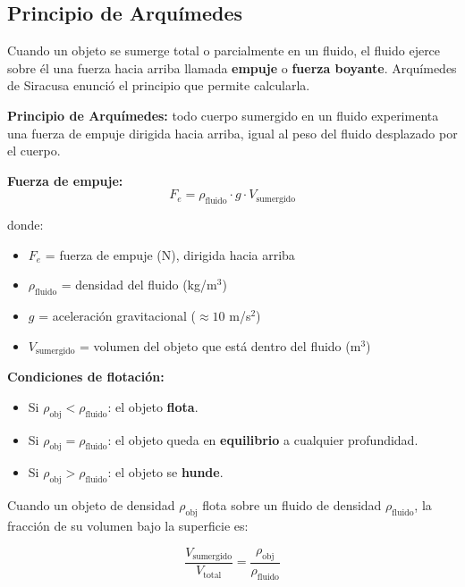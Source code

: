 \subsection{Principio de Arquímedes}

\begin{seccion}
Cuando un objeto se sumerge total o parcialmente en un fluido, el fluido ejerce sobre él una fuerza hacia arriba llamada \textbf{empuje} o \textbf{fuerza boyante}. Arquímedes de Siracusa enunció el principio que permite calcularla.

\begin{definicion}
\textbf{Principio de Arquímedes:} todo cuerpo sumergido en un fluido experimenta una fuerza de empuje dirigida hacia arriba, igual al peso del fluido desplazado por el cuerpo.
\end{definicion}

\begin{ecuacion}
\textbf{Fuerza de empuje:}
$$F_e = \rho_{\text{fluido}} \cdot g \cdot V_{\text{sumergido}}$$

donde:
\begin{itemize}
    \item $F_e$ = fuerza de empuje (N), dirigida hacia arriba
    \item $\rho_{\text{fluido}}$ = densidad del fluido (kg/m$^3$)
    \item $g$ = aceleración gravitacional ($\approx 10$ m/s$^2$)
    \item $V_{\text{sumergido}}$ = volumen del objeto que está dentro del fluido (m$^3$)
\end{itemize}
\end{ecuacion}

\textbf{Condiciones de flotación:}
\begin{itemize}
    \item Si $\rho_{\text{obj}} < \rho_{\text{fluido}}$: el objeto \textbf{flota}.
    \item Si $\rho_{\text{obj}} = \rho_{\text{fluido}}$: el objeto queda en \textbf{equilibrio} a cualquier profundidad.
    \item Si $\rho_{\text{obj}} > \rho_{\text{fluido}}$: el objeto se \textbf{hunde}.
\end{itemize}

Cuando un objeto de densidad $\rho_{\text{obj}}$ flota sobre un fluido de densidad $\rho_{\text{fluido}}$, la fracción de su volumen bajo la superficie es:

$$\frac{V_{\text{sumergido}}}{V_{\text{total}}} = \frac{\rho_{\text{obj}}}{\rho_{\text{fluido}}}$$
\end{seccion}

